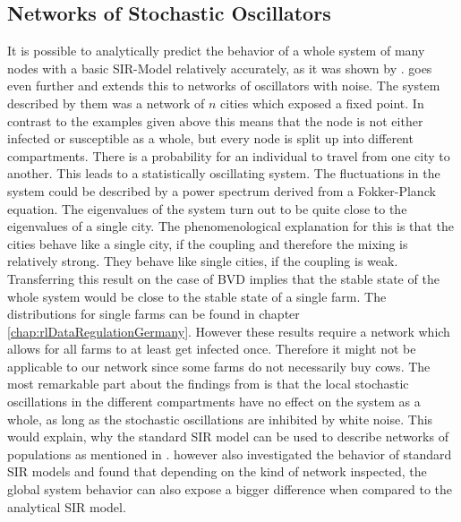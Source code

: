 \subsection{Networks of Stochastic Oscillators}
It is possible to analytically predict the behavior of a whole system of many nodes with a basic SIR-Model relatively accurately, as it was shown by \citep{Keeling20051}. \citep{ROZ11} goes even further and extends this to networks of oscillators with noise. The system described by them was a network of $n$ cities which exposed a fixed point. In contrast to the examples given above this means that the node is not either infected or susceptible as a whole, but every node is split up into different compartments. There is a probability for an individual to travel from one city to another. This leads to a statistically oscillating system. The fluctuations in the system could be described by a power spectrum derived from a Fokker-Planck equation. 
The eigenvalues of the system turn out to be quite close to the eigenvalues of a single city. The phenomenological explanation for this is that the cities behave like a single city, if the coupling and therefore the mixing is relatively strong. They behave like single cities, if the coupling is weak. 
Transferring this result on the case of BVD implies that the stable state of the whole system would be close to the stable state of a single farm. The distributions for single farms can be found in chapter \ref{chap:rlDataRegulationGermany}. However these results require a network which allows for all farms to at least get infected once. Therefore it might not be applicable to our network since some farms do not necessarily buy cows. The most remarkable part about the findings from \citep{ROZ11} is that the local stochastic oscillations in the different compartments have no effect on the system as a whole, as long as the stochastic oscillations are inhibited by white noise. This would explain, why the standard SIR model can be used to describe networks of populations as mentioned in \citep{Keeling20051}. \citep{witten2007simulations} however also investigated the behavior of standard SIR models and found that depending on the kind of network inspected, the global system behavior can also expose a bigger difference when compared to the analytical SIR model. 